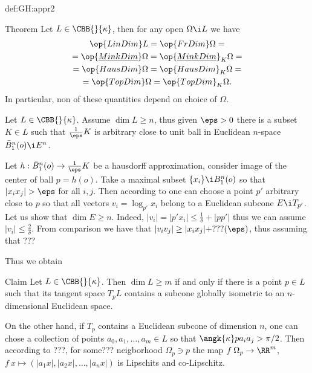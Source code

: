 {\begin{subthm}{def:GH:appr2}
\begin{thm}{Theorem}\label{thm:dim=dim}
Let $L\in\CBB{}{\kappa}$, then for any open $\Omega\i L$ we have
\begin{multline*}
\op{LinDim} L
=
\op{FrDim}\Omega=\\
=
\op{\underline{MinkDim}}\Omega
=
\op{\underline{MinkDim}}_K\Omega=\\
=
\op{HausDim}\Omega
=
\op{HausDim}_K\Omega=\\
=
\op{TopDim}\Omega
=
\op{TopDim}_K\Omega.
\end{multline*}
In particular, non of these quantities depend on choice of $\Omega$.
\end{thm}











Let $L\in\CBB{}{\kappa}$.
Assume $\dim L\ge n$, thus given $\eps>0$ there is a subset $K\in L$ such that $\tfrac1\eps K$ is arbitrary close to unit ball in Euclidean $n$-space $\bar B^n_1(o)\i E^n$. 

Let $h:\bar B^n_1(o)\to \tfrac1\eps K$ be a hausdorff approximation, consider image of the center of ball $p=h(o)$. 
Take a maximal subset $\{x_i\}\i B^n_1(o)$ so that $|x_ix_j|>\eps$ for all $i,j$.
Then according to one can choose a point $p'$ arbitrary close to $p$ so that all vectors $v_i=\log_{p'}x_i$ belong to a Euclidean subcone $E\i T_{p'}$.
Let us show that $\dim E\ge n$.
Indeed, $|v_i|=|p'x_i|\le \tfrac1\delta+|pp'|$ thus we can assume $|v_i|\le \tfrac2\delta$.
From comparison we have that $|v_iv_j|\ge |x_ix_j|+???(\eps)$, thus assuming that ???

Thus we obtain 

\begin{thm}{Claim}
Let $L\in\CBB{}{\kappa}$.
Then $\dim L\ge m$ if and only if there is a point $p\in L$ such that its tangent space $T_pL$ contains a subcone globally isometric to an $n$-dimensional Euclidean space.
\end{thm}

On the other hand, if $T_p$ contains a Euclidean subcone of dimension $n$, one can chose a collection of points $a_0,a_1,\dots,a_m\in L$ so that $\angk{\kappa}p{a_i}{a_j}>\pi/2$.
Then according to ???, for some??? neigborhood $\Omega_p\ni p$ the map $f\:\Omega_p\to\RR^m$,
$f\:x\mapsto(|a_1x|,|a_2x|,\dots,|a_nx|)$ is Lipschits and co-Lipschitz.



















\end{subthm}}
